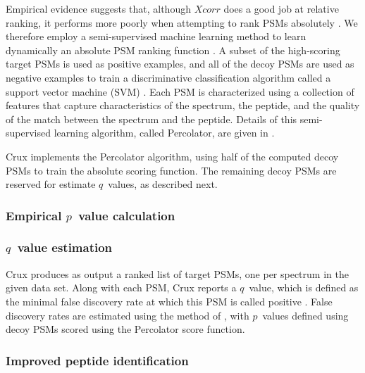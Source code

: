\documentclass[12pt]{article}
\begin{document}
Empirical evidence suggests that, although $Xcorr$ does a good job at
relative ranking, it performs more poorly when attempting to rank PSMs
absolutely \cite{keller:empirical, anderson:new}.  We therefore employ
a semi-supervised machine learning method to learn dynamically an
absolute PSM ranking function \cite{kall:semi-supervised}.  A subset
of the high-scoring target PSMs is used as positive examples, and all
of the decoy PSMs are used as negative examples to train a
discriminative classification algorithm called a support vector
machine (SVM) \cite{boser:training, noble:what}.  Each PSM is
characterized using a collection of features that capture
characteristics of the spectrum, the peptide, and the quality of the
match between the spectrum and the peptide.  Details of this
semi-supervised learning algorithm, called Percolator, are given in
\cite{kall:semi-supervised}.

Crux implements the Percolator algorithm, using half of the computed
decoy PSMs to train the absolute scoring function.  The remaining
decoy PSMs are reserved for estimate $q$~values, as described next.

\subsubsection{Empirical $p$~value calculation}

\subsubsection{$q$~value estimation}
\label{section:q-value}

Crux produces as output a ranked list of target PSMs, one per spectrum
in the given data set.  Along with each PSM, Crux reports a $q$~value,
which is defined as the minimal false discovery rate at which this PSM
is called positive \cite{storey:statistical}.  False discovery rates
are estimated using the method of \cite{benjamini:controlling}, with
$p$~values defined using decoy PSMs scored using the Percolator score
function.

\subsubsection{Improved peptide identification}
\end{document}
